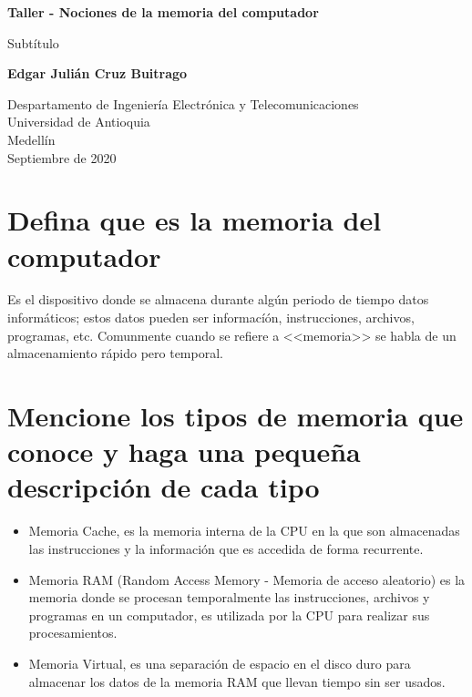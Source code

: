 \documentclass{article}
\begin{document}
\begin{titlepage}
    \begin{center}
        \vspace*{1cm}
            
        \Huge
        \textbf{Taller - Nociones de la memoria del computador}
            
        \vspace{0.5cm}
        \LARGE
        Subtítulo
            
        \vspace{1.5cm}
            
        \textbf{Edgar Julián Cruz Buitrago}
            
        \vfill
            
        \vspace{0.8cm}
            
        \Large
        Despartamento de Ingeniería Electrónica y Telecomunicaciones\\
        Universidad de Antioquia\\
        Medellín\\
        Septiembre de 2020
            
    \end{center}
\end{titlepage}

\tableofcontents

\section{Defina que es la memoria del computador}
Es el dispositivo donde se almacena durante algún periodo de tiempo datos informáticos; estos datos pueden ser informacíón, instrucciones, archivos, programas, etc.
Comunmente cuando se refiere a <<memoria>> se habla de un almacenamiento rápido pero temporal.

\section{Mencione los tipos de memoria que conoce y haga una pequeña descripción de cada tipo} 
\begin{itemize}
    \item Memoria Cache, es la memoria interna de la CPU en la que son almacenadas las instrucciones y la información que es accedida de forma recurrente.
    \item Memoria RAM (Random Access Memory - Memoria de acceso aleatorio) es la memoria donde se procesan temporalmente las instrucciones, archivos y programas en un computador, es utilizada por la CPU para realizar sus procesamientos.
    \item Memoria Virtual, es una separación de espacio en el disco duro para almacenar los datos de la memoria RAM que llevan tiempo sin ser usados.
\end{itemize}
\end{document}
